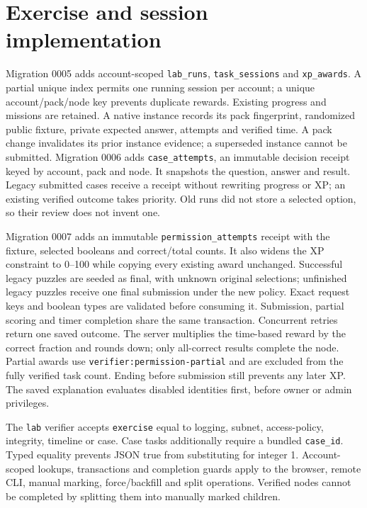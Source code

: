 \section{Exercise and session implementation}
Migration 0005 adds account-scoped \texttt{lab\_runs}, \texttt{task\_sessions} and
\texttt{xp\_awards}. A partial unique index permits one running session per account;
a unique account/pack/node key prevents duplicate rewards. Existing progress and
missions are retained. A native instance records its pack fingerprint, randomized
public fixture, private expected answer, attempts and verified time. A pack change
invalidates its prior instance evidence; a superseded instance cannot be submitted.
Migration 0006 adds \texttt{case\_attempts}, an immutable decision receipt keyed by
account, pack and node. It snapshots the question, answer and result. Legacy
submitted cases receive a receipt without rewriting progress or XP; an existing
verified outcome takes priority. Old runs did not store a selected option, so
their review does not invent one.

Migration 0007 adds an immutable \texttt{permission\_attempts} receipt with the
fixture, selected booleans and correct/total counts. It also widens the XP constraint
to 0--100 while copying every existing award unchanged. Successful legacy puzzles
are seeded as final, with unknown original selections; unfinished legacy puzzles
receive one final submission under the new policy. Exact request keys and boolean
types are validated before consuming it. Submission, partial scoring and timer
completion share the same transaction. Concurrent retries return one saved outcome.
The server multiplies the time-based reward by the correct fraction and rounds
down; only all-correct results complete the node. Partial awards use
\texttt{verifier:permission-partial} and are excluded from the fully verified task
count. Ending before submission still prevents any later XP. The saved explanation
evaluates disabled identities first, before owner or admin privileges.

The \texttt{lab} verifier accepts \texttt{exercise} equal to logging, subnet,
access-policy, integrity, timeline or case. Case tasks additionally require a bundled
\texttt{case\_id}. Typed equality prevents JSON true from substituting for integer 1.
Account-scoped lookups, transactions and completion guards apply to the browser,
remote CLI, manual marking, force/backfill and split operations. Verified nodes
cannot be completed by splitting them into manually marked children.

